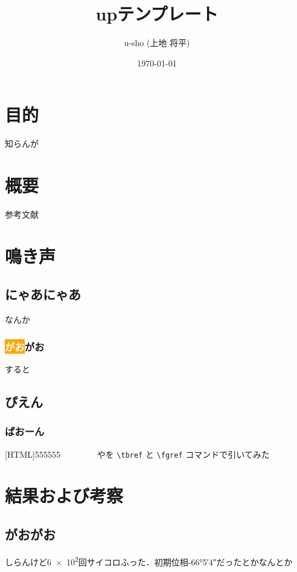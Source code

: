 \documentclass[uplatex,dvipdfmx]{u-sho_jsarticle}
\title{up\LaTeXe テンプレート} %
\author{u-sho (上地 将平)}
\date{\today}
\begin{document}
  \maketitle
  \tableofcontents

  \newpage

  \section{目的}%
    知らんが

  \section{概要}%
    参考文献~\cite{キー1}

  \section{鳴き声} %

    \subsection{にゃあにゃあ}
      なんか

    \subsubsection{\colorbox{orange}{\textcolor{white}{がお}}がお}
      すると

  \subsection{ぴえん} %

  \subsubsection{ぱおーん}
    [HTML]{555555}{\textcolor{white}{ぱおーん}}
    やを \verb|\tbref| と \verb|\fgref| コマンドで引いてみた

  \newpage

  \section{結果および考察}
    \subsection{がおがお}
      しらんけど\num{6e2}回サイコロふった．初期位相\ang{-66;5;4}だったとかなんとか
\end{document}
